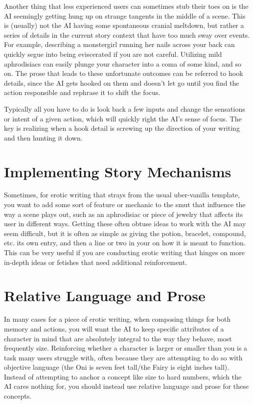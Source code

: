 ﻿\documentclass[Coomer-main.tex]{subfiles}
\begin{document}
Another thing that less experienced users can sometimes stub their toes on is the AI seemingly getting hung up on strange tangents in the middle of a scene. This is (usually) not the AI having some spontaneous cranial meltdown, but rather a series of details in the current story context that have too much sway over events. For example, describing a monstergirl running her nails across your back can quickly segue into being eviscerated if you are not careful. Utilizing mild aphrodisiacs can easily plunge your character into a coma of some kind, and so on. The prose that leads to these unfortunate outcomes can be referred to hook details, since the AI gets hooked on them and doesn't let go until you find the action responsible and rephrase it to shift the focus.

Typically all you have to do is look back a few inputs and change the sensations or intent of a given action, which will quickly right the AI's sense of focus. The key is realizing when a hook detail is screwing up the direction of your writing and then hunting it down.

\section{Implementing Story Mechanisms}

Sometimes, for erotic writing that strays from the usual uber-vanilla template, you want to add some sort of feature or mechanic to the smut that influence the way a scene plays out, such as an aphrodisiac or piece of jewelry that affects its user in different ways. Getting these often obtuse ideas to work with the AI may seem difficult, but it is often as simple as giving the potion, bracelet, compound, etc. its own \wi entry, and then a line or two in your \rem on how it is meant to function. This can be very useful if you are conducting erotic writing that hinges on more in-depth ideas or fetishes that need additional reinforcement.

\section{Relative Language and Prose}

In many cases for a piece of erotic writing, when composing things for both memory and actions, you will want the AI to keep specific attributes of a character in mind that are absolutely integral to the way they behave, most frequently size. Reinforcing whether a character is larger or smaller than you is a task many users struggle with, often because they are attempting to do so with objective language (the Oni is seven feet tall/the Fairy is eight inches tall). Instead of attempting to anchor a concept like size to hard numbers, which the AI cares nothing for, you should instead use relative language and prose for these concepts.
\end{document}
